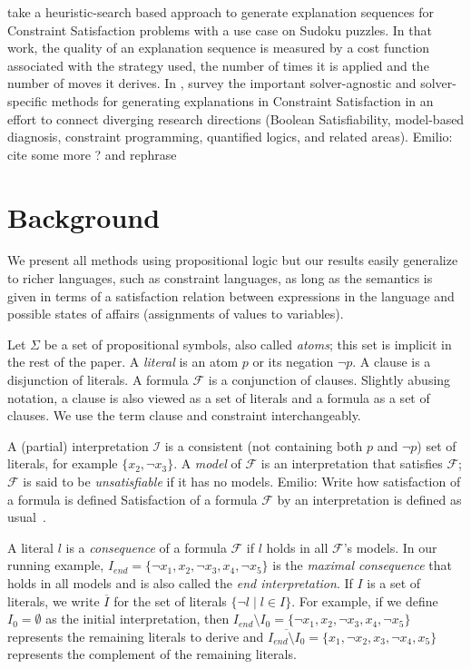 \documentclass[twoside,11pt]{article}
\newcommand\m[1]{\mathcal{#1}}
\newcommand\comment[1]{\marginpar{\tiny #1}}
\renewcommand\comment[1]{#1}
\newcommand{\emilio}[1]{{\comment{\color{red}Emilio: #1}}}
\newcommand\Iend{\ensuremath{I_\mathit{end} }\xspace}
\newcommand\formula{\ensuremath{\m{F} }\xspace}
\newcommand\mm[1]{\ensuremath{#1}\xspace}
\newcommand\voc{\ensuremath{\Sigma}\xspace}
\newcommand\negset[1]{\mm{\overline{#1}}}
\begin{document}
\cite{bjornssonsearching} take a heuristic-search based approach to generate explanation sequences for Constraint Satisfaction problems with a use case on Sudoku puzzles. In that work, the quality of an explanation sequence is measured by a cost function associated with the strategy used, the number of times it is applied and the number of moves it derives.
In \cite{surveycsp2021}, \citeauthor{surveycsp2021} survey the important solver-agnostic \cite{junker2001quickxplain,ignatiev2015smallest,felfernig2012efficient} and solver-specific methods for generating explanations in Constraint Satisfaction in an effort to %
connect diverging research directions (Boolean Satisfiability, model-based diagnosis, constraint programming, quantified logics, and related areas). \emilio{cite some more ? and rephrase}

\section{Background}\label{sec:background}

We present all methods using propositional logic but our results easily generalize to richer languages, such as constraint languages, as long as the semantics is given in terms of a satisfaction relation  between expressions in the language and possible states of affairs (assignments of values to variables).

Let \voc be a set of propositional symbols, also called \emph{atoms}; this set is implicit in the rest of the paper. A \emph{literal} is an atom $p$ or its negation $\lnot p$. 
A clause is a disjunction of literals. A formula $\formula$ is a conjunction of clauses. 
Slightly abusing notation, a clause is also viewed as a set of literals and a formula as a set of clauses. We use the term clause and constraint interchangeably.

A (partial) interpretation $\m{I}$ is a consistent (not containing both $p$ and $\lnot p$) set of literals, for example $\{x_2,  \lnot x_3\}$. 
A \emph{model} of \formula is an interpretation that satisfies \formula; $\formula$ is said to be \emph{unsatisfiable} if it has no models.
\emilio{Write how satisfaction of a formula is defined}
Satisfaction of a formula \formula by an interpretation is defined as usual~\cite{faia/2009-185}.

A literal $l$ is a \emph{consequence} of a formula \formula if $l$ holds in all $\formula$'s models. 
In our running example, $\Iend = \{\lnot x_1, x_2,  \lnot x_3, x_4, \lnot x_5\}$ is the \emph{maximal consequence} that holds in all models and is also called the \emph{end interpretation}.
If $I$ is a set of literals, we write $\negset{I}$ for the set of literals $\{\lnot l\mid l\in I\}$.
For example, if we define $I_0 = \emptyset$ as the initial interpretation, then $\Iend \setminus I_0 = \{\lnot x_1, x_2,  \lnot x_3, x_4, \lnot x_5\}$ represents the remaining literals to derive and $\negset{\Iend \setminus I_0} = \{x_1, \lnot x_2,  x_3, \lnot x_4, x_5\}$ represents the complement of the remaining literals.
\end{document}
